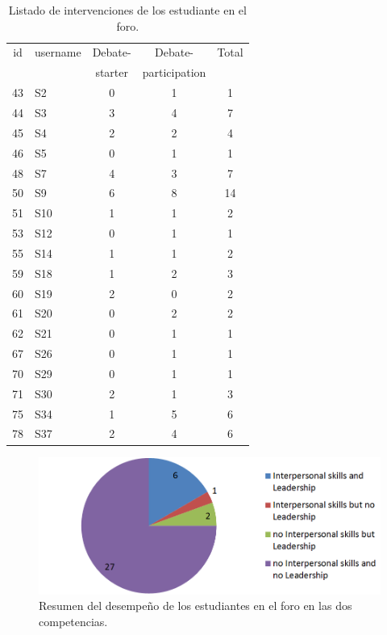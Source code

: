 \begin{table}
	\centering
	\caption{Listado de intervenciones de los estudiante en el foro.}
	\label{tab:EvcEvaluacionListadoForo1}
	\begin{tabular}{|c|l|c|c|c|}
		\hline
		id & username & Debate- & Debate- & Total  \\
			&		&	starter	& participation		&		\\
		\hline
		\hline
		43 &	S2 &	0 &	1 &	 1 \\
		44 &	S3 &	3 &	4 &	 7 \\
		45 &	S4 &	2 &	2 &	 4 \\
		46 &	S5 &	0 &	1 &	 1 \\
		48 &	S7 &	4 &	3 &	 7 \\
		50 &	S9 &	6 &	8 &	 14 \\
		51 &	S10 &	1 &	1 &	 2 \\
		53 &	S12 &	0 &	1 &	 1 \\
		55 &	S14 &	1 &	1 &	 2 \\
		59 &	S18 &	1 &	2 &	 3 \\
		60 &	S19 &	2 &	0 &	 2 \\
		61 &	S20 &	0 &	2 &	 2 \\
		62 &	S21 &	0 &	1 &	 1 \\
		67 &	S26 &	0 &	1 &	 1 \\
		70 &	S29 &	0 &	1 &	 1 \\
		71 &	S30 &	2 &	1 &	 3 \\
		75 &	S34 &	1 &	5 &	 6 \\
		78 &	S37 &	2 &	4 &	 6 \\
		\hline
	\end{tabular}
\end{table}

\begin{figure}
	\centering
	\includegraphics[width=12cm]{EvcForo1.png}
	\caption{Resumen del desempeño de los estudiantes en el foro en las dos competencias.}
	\label{fig:EvcEvaluacionTartaForo1}
\end{figure}

